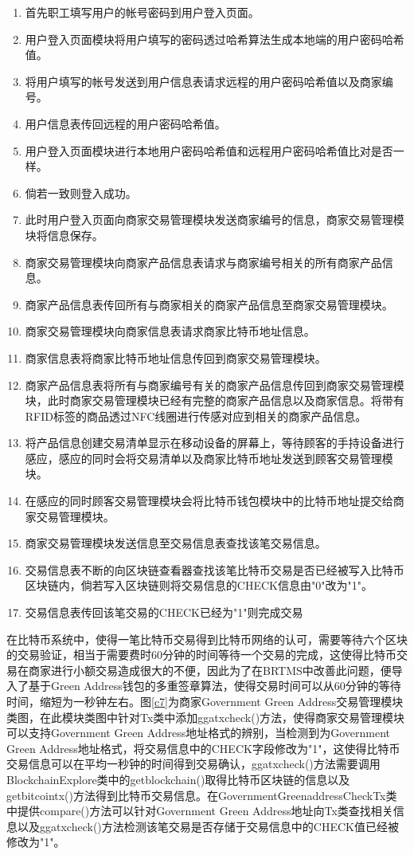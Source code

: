 	\begin{enumerate}
	\item 首先职工填写用户的帐号密码到用户登入页面。
	\item 用户登入页面模块将用户填写的密码透过哈希算法生成本地端的用户密码哈希值。
	\item 将用户填写的帐号发送到用户信息表请求远程的用户密码哈希值以及商家编号。
	\item 用户信息表传回远程的用户密码哈希值。
	\item 用户登入页面模块进行本地用户密码哈希值和远程用户密码哈希值比对是否一样。
	\item 倘若一致则登入成功。
	\item 此时用户登入页面向商家交易管理模块发送商家编号的信息，商家交易管理模块将信息保存。
	\item 商家交易管理模块向商家产品信息表请求与商家编号相关的所有商家产品信息。
	\item 商家产品信息表传回所有与商家相关的商家产品信息至商家交易管理模块。
	\item 商家交易管理模块向商家信息表请求商家比特币地址信息。
	\item 商家信息表将商家比特币地址信息传回到商家交易管理模块。
	\item 商家产品信息表将所有与商家编号有关的商家产品信息传回到商家交易管理模块，此时商家交易管理模块已经有完整的商家产品信息以及商家信息。将带有RFID标签的商品透过NFC线圈进行传感对应到相关的商家产品信息。
	\item 将产品信息创建交易清单显示在移动设备的屏幕上，等待顾客的手持设备进行感应，感应的同时会将交易清单以及商家比特币地址发送到顾客交易管理模块。

	\item 在感应的同时顾客交易管理模块会将比特币钱包模块中的比特币地址提交给商家交易管理模块。
	\item 商家交易管理模块发送信息至交易信息表查找该笔交易信息。
	\item 交易信息表不断的向区块链查看器查找该笔比特币交易是否已经被写入比特币区块链内，倘若写入区块链则将交易信息的CHECK信息由"0"改为"1"。
	\item 交易信息表传回该笔交易的CHECK已经为"1"则完成交易
	
	\end{enumerate}

	在比特币系统中，使得一笔比特币交易得到比特币网络的认可，需要等待六个区块的交易验证，相当于需要费时60分钟的时间等待一个交易的完成，这使得比特币交易在商家进行小额交易造成很大的不便，因此为了在BRTMS中改善此问题，便导入了基于Green Address钱包的多重签章算法，使得交易时间可以从60分钟的等待时间，缩短为一秒钟左右。图\ref{c7}为商家Government Green Address交易管理模块类图，在此模块类图中针对Tx类中添加ggatxcheck()方法，使得商家交易管理模块可以支持Government Green Address地址格式的辨别，当检测到为Government Green Address地址格式，将交易信息中的CHECK字段修改为"1"，这使得比特币交易信息可以在平均一秒钟的时间得到交易确认，ggatxcheck()方法需要调用BlockchainExplore类中的getblockchain()取得比特币区块链的信息以及getbitcointx()方法得到比特币交易信息。在GovernmentGreenaddressCheckTx类中提供compare()方法可以针对Government Green Address地址向Tx类查找相关信息以及ggatxcheck()方法检测该笔交易是否存储于交易信息中的CHECK值已经被修改为"1"。


